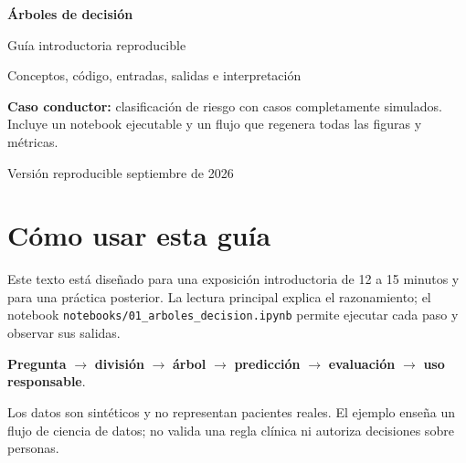 \documentclass[11pt,oneside,openany]{book}
\begin{document}
\begin{titlepage}
  \pagecolor{Petroleo}
  \color{white}
  \vspace*{2.0cm}
  {\sffamily\bfseries\fontsize{34}{39}\selectfont
    Árboles de decisión\par}
  \vspace{0.5cm}
  {\sffamily\fontsize{20}{25}\selectfont
    Guía introductoria reproducible\par}
  \vspace{1.1cm}
  {\large Conceptos, código, entradas, salidas e interpretación\par}
  \vfill
  \begin{tcolorbox}[colback=white,colframe=white,arc=2mm]
    \color{Tinta}
    \textbf{Caso conductor:} clasificación de riesgo con \NTotal{} casos
    completamente simulados. Incluye un notebook ejecutable y un flujo que
    regenera todas las figuras y métricas.
  \end{tcolorbox}
  \vspace{0.8cm}
  {\sffamily\small Versión reproducible \textbullet{} septiembre de 2026}
\end{titlepage}
\nopagecolor
\color{Tinta}

\frontmatter
\chapter*{Cómo usar esta guía}

Este texto está diseñado para una exposición introductoria de 12 a 15 minutos
y para una práctica posterior. La lectura principal explica el razonamiento; el
notebook \texttt{notebooks/01\_arboles\_decision.ipynb} permite ejecutar cada
paso y observar sus salidas.

\begin{idea}
\textbf{Pregunta} $\rightarrow$ \textbf{división} $\rightarrow$
\textbf{árbol} $\rightarrow$ \textbf{predicción} $\rightarrow$
\textbf{evaluación} $\rightarrow$ \textbf{uso responsable}.
\end{idea}

\begin{alerta}[Alcance]
Los datos son sintéticos y no representan pacientes reales. El ejemplo enseña
un flujo de ciencia de datos; no valida una regla clínica ni autoriza decisiones
sobre personas.
\end{alerta}

\tableofcontents

\mainmatter
\end{document}
